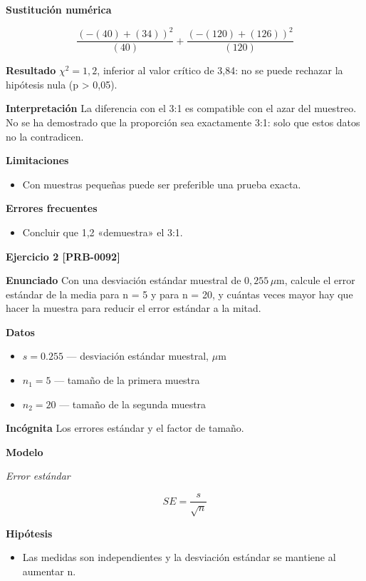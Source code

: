 \documentclass{book}
\begin{document}
\noindent\textbf{Sustitución numérica}

\[
\frac{\left(- \left(40\right) + \left(34\right)\right)^{2}}{\left(40\right)} + \frac{\left(- \left(120\right) + \left(126\right)\right)^{2}}{\left(120\right)}
\]

\noindent\textbf{Resultado}
\(\chi^{2} = 1,2\), inferior al valor crítico de 3,84: no se puede rechazar la hipótesis nula (p > 0,05).


\noindent\textbf{Interpretación}
La diferencia con el 3:1 es compatible con el azar del muestreo. No se ha demostrado que la proporción sea exactamente 3:1: solo que estos datos no la contradicen.


\noindent\textbf{Limitaciones}
\begin{itemize}
\item Con muestras pequeñas puede ser preferible una prueba exacta.
\end{itemize}

\noindent\textbf{Errores frecuentes}
\begin{itemize}
\item Concluir que 1,2 «demuestra» el 3:1.
\end{itemize}

\noindent\textbf{Ejercicio 2 [PRB-0092]}

\noindent\textbf{Enunciado}
Con una desviación estándar muestral de \(0{,}255\,\mu\mathrm{m}\), calcule el error estándar de la media para n = 5 y para n = 20, y cuántas veces mayor hay que hacer la muestra para reducir el error estándar a la mitad.


\noindent\textbf{Datos}
\begin{itemize}
\item $s = 0.255$ — desviación estándar muestral, \(\mu\mathrm{m}\)
\item $n_{1} = 5$ — tamaño de la primera muestra
\item $n_{2} = 20$ — tamaño de la segunda muestra
\end{itemize}

\noindent\textbf{Incógnita}
Los errores estándar y el factor de tamaño.


\noindent\textbf{Modelo}

\noindent\textit{Error estándar}

\[
SE = \frac{s}{\sqrt{n}}
\]

\noindent\textbf{Hipótesis}
\begin{itemize}
\item Las medidas son independientes y la desviación estándar se mantiene al aumentar n.
\end{itemize}
\end{document}
